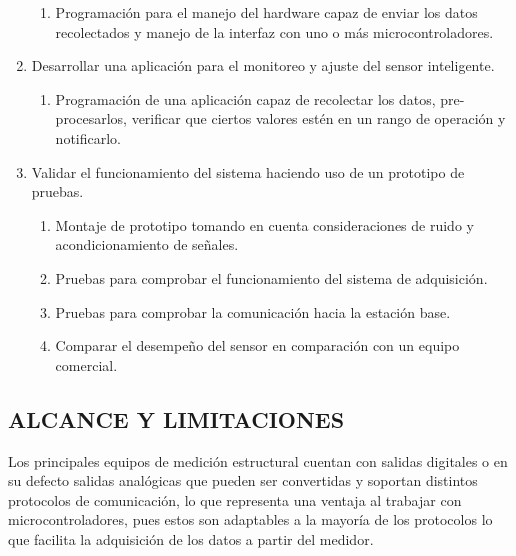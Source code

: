 \documentclass[12pt,letterpaper]{article}
\begin{document}
\begin{enumerate}[1.]
\begin{enumerate}
			\item Programación para el manejo del hardware capaz de enviar los datos recolectados y manejo de la interfaz con uno o más microcontroladores.

	      \end{enumerate}

	\item Desarrollar una aplicación para el monitoreo y ajuste del sensor inteligente.


	      \begin{enumerate}

			\item Programación de una aplicación capaz de recolectar los datos, pre-procesarlos, verificar que ciertos valores estén en un rango de operación y notificarlo.

	      \end{enumerate}

	\item Validar el funcionamiento del sistema haciendo uso de un prototipo de pruebas.


	      \begin{enumerate}

			  \item Montaje de prototipo tomando en cuenta consideraciones de ruido y acondicionamiento de señales.
		      \item Pruebas para comprobar el funcionamiento del sistema de adquisición.
		      \item Pruebas para comprobar la comunicación hacia la estación base.
		      \item Comparar el desempeño del sensor en comparación con un equipo comercial.

	      \end{enumerate}





\end{enumerate}




\newpage


\begin{center}

	\section*{ALCANCE Y LIMITACIONES}
\end{center}

Los principales equipos de medición estructural cuentan con salidas digitales o en su defecto salidas analógicas que pueden ser convertidas y soportan distintos protocolos de comunicación, lo que representa una ventaja al trabajar con microcontroladores, pues estos son adaptables a la mayoría de los protocolos lo que facilita la adquisición de los datos a partir del medidor.
\end{document}
